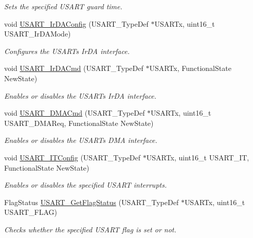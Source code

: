 \begin{DoxyCompactItemize}
\begin{DoxyCompactList}\small\item\em Sets the specified U\+S\+A\+RT guard time. \end{DoxyCompactList}\item 
void \mbox{\hyperlink{group___u_s_a_r_t_ga81a0cd36199040bf6d266b57babd678e}{U\+S\+A\+R\+T\+\_\+\+Ir\+D\+A\+Config}} (U\+S\+A\+R\+T\+\_\+\+Type\+Def $\ast$U\+S\+A\+R\+Tx, uint16\+\_\+t U\+S\+A\+R\+T\+\_\+\+Ir\+D\+A\+Mode)
\begin{DoxyCompactList}\small\item\em Configures the U\+S\+A\+RT\textquotesingle{}s Ir\+DA interface. \end{DoxyCompactList}\item 
void \mbox{\hyperlink{group___u_s_a_r_t_gabff56ebb494fdfadcc6ef4fe9ac8dd24}{U\+S\+A\+R\+T\+\_\+\+Ir\+D\+A\+Cmd}} (U\+S\+A\+R\+T\+\_\+\+Type\+Def $\ast$U\+S\+A\+R\+Tx, Functional\+State New\+State)
\begin{DoxyCompactList}\small\item\em Enables or disables the U\+S\+A\+RT\textquotesingle{}s Ir\+DA interface. \end{DoxyCompactList}\item 
void \mbox{\hyperlink{group___u_s_a_r_t_ga902857f199ebfba21c63d725354af66f}{U\+S\+A\+R\+T\+\_\+\+D\+M\+A\+Cmd}} (U\+S\+A\+R\+T\+\_\+\+Type\+Def $\ast$U\+S\+A\+R\+Tx, uint16\+\_\+t U\+S\+A\+R\+T\+\_\+\+D\+M\+A\+Req, Functional\+State New\+State)
\begin{DoxyCompactList}\small\item\em Enables or disables the U\+S\+A\+RT\textquotesingle{}s D\+MA interface. \end{DoxyCompactList}\item 
void \mbox{\hyperlink{group___u_s_a_r_t_ga6d8f2dd1f34060ae7e386e3e5d56b6f6}{U\+S\+A\+R\+T\+\_\+\+I\+T\+Config}} (U\+S\+A\+R\+T\+\_\+\+Type\+Def $\ast$U\+S\+A\+R\+Tx, uint16\+\_\+t U\+S\+A\+R\+T\+\_\+\+IT, Functional\+State New\+State)
\begin{DoxyCompactList}\small\item\em Enables or disables the specified U\+S\+A\+RT interrupts. \end{DoxyCompactList}\item 
Flag\+Status \mbox{\hyperlink{group___u_s_a_r_t_ga144630722defc9e312f0ad280b68e9da}{U\+S\+A\+R\+T\+\_\+\+Get\+Flag\+Status}} (U\+S\+A\+R\+T\+\_\+\+Type\+Def $\ast$U\+S\+A\+R\+Tx, uint16\+\_\+t U\+S\+A\+R\+T\+\_\+\+F\+L\+AG)
\begin{DoxyCompactList}\small\item\em Checks whether the specified U\+S\+A\+RT flag is set or not. \end{DoxyCompactList}\item 

\end{DoxyCompactItemize}
